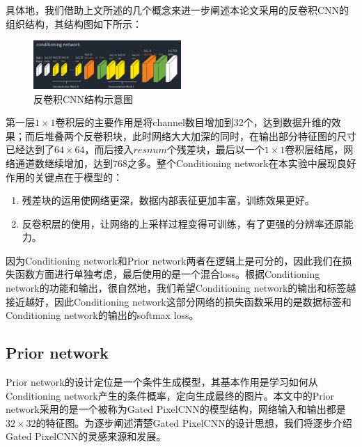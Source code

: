具体地，我们借助上文所述的几个概念来进一步阐述本论文采用的反卷积CNN的组织结构，其结构图如下所示：

\begin{figure}[htp]
    \centering
    \includegraphics[width=0.5\textwidth]{figures/condition_network}
    \caption{反卷积CNN结构示意图}
\end{figure}

第一层$1\times 1$卷积层的主要作用是将channel数目增加到32个，达到数据升维的效果；而后堆叠两个反卷积块，此时网络大大加深的同时，在输出部分特征图的尺寸已经达到了$64\times 64$，而后接入$resnum$个残差块，最后以一个$1\times 1$卷积层结尾，网络通道数继续增加，达到$768$之多。整个Conditioning network在本实验中展现良好作用的关键点在于模型的：

\begin{enumerate}
    \item 残差块的运用使网络更深，数据内部表征更加丰富，训练效果更好。
    \item 反卷积层的使用，让网络的上采样过程变得可训练，有了更强的分辨率还原能力。
\end{enumerate}

因为Conditioning network和Prior network两者在逻辑上是可分的，因此我们在损失函数方面进行单独考虑，最后使用的是一个混合loss。根据Conditioning network的功能和输出，很自然地，我们希望Conditioning network的输出和标签越接近越好，因此Conditioning network这部分网络的损失函数采用的是数据标签和Conditioning network的输出的softmax loss。

\subsection{Prior network}

Prior network的设计定位是一个条件生成模型，其基本作用是学习如何从Conditioning network产生的条件概率，定向生成最终的图片。本文中的Prior network采用的是一个被称为Gated PixelCNN的模型结构，网络输入和输出都是$32\times 32$的特征图。为逐步阐述清楚Gated PixelCNN的设计思想，我们将逐步介绍Gated PixelCNN的灵感来源和发展。

